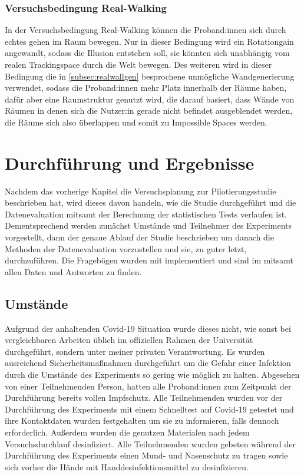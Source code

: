         \subsection{Versuchsbedingung Real-Walking}\label{subsec:realwalk}
            In der Versuchsbedingung Real-Walking können die Proband:innen sich durch echtes gehen im Raum bewegen. Nur in dieser Bedingung wird ein Rotationgain angewandt, sodass die Illusion entstehen soll, sie könnten sich unabhängig vom realen Trackingspace durch die Welt bewegen.
            Des weiteren wird in dieser Bedingung die in \autoref{subsec:realwallgen} besprochene unmögliche Wandgenerierung verwendet, sodass die Proband:innen mehr Platz innerhalb der Räume haben, dafür aber eine Raumstruktur genutzt wird, die darauf basiert, dass Wände von Räumen in denen sich die Nutzer:in gerade nicht befindet ausgeblendet werden, die Räume sich also überlappen und somit zu Impossible Spaces werden.




\chapter{Durchführung und Ergebnisse}\label{}
    Nachdem das vorherige Kapitel die Versuchsplanung zur Pilotierungsstudie beschrieben hat, wird dieses davon handeln, wie die Studie durchgeführt und die Datenevaluation mitsamt der Berechnung der statistischen Tests verlaufen ist. Dementsprechend werden zunächst Umstände und Teilnehmer des Experiments vorgestellt, dann der genaue Ablauf der Studie beschrieben um danach die Methoden der Datenevaluation vorzustellen und sie, zu guter letzt, durchzuführen. Die Fragebögen wurden mit  implementiert und sind im  mitsamt allen Daten und Antworten zu finden.

    \section{Umstände}\label{sec:circumstances}
        Aufgrund der anhaltenden Covid-19 Situation wurde dieses nicht, wie sonst bei vergleichbaren Arbeiten üblich im offiziellen Rahmen der Universität durchgeführt, sondern unter meiner privaten Verantwortung. Es wurden ausreichend Sicherheitsmaßnahmen durchgeführt um die Gefahr einer Infektion durch die Umstände des Experiments so gering wie möglich zu halten. Abgesehen von einer Teilnehmenden Person, hatten alle Proband:innen zum Zeitpunkt der Durchführung bereits vollen Impfschutz.
        Alle Teilnehmenden wurden vor der Durchführung des Experiments mit einem Schnelltest auf Covid-19 getestet und ihre Kontaktdaten wurden festgehalten um sie zu informieren, falls dennoch erforderlich. Außerdem wurden die genutzen Materialen nach jedem Versuchsdurchlauf desinfiziert.
        Alle Teilnehmenden wurden gebeten während der Durchführung des Experiments einen Mund- und Nasenschutz zu tragen sowie sich vorher die Hände mit Handdesinfektionsmittel zu desinfizieren.

